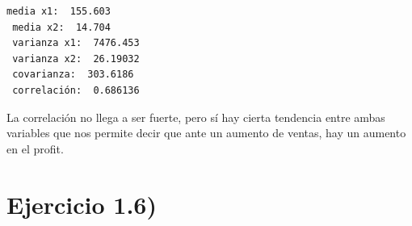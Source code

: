 \documentclass[
]{article}
\newenvironment{Shaded}{\begin{snugshade}}{\end{snugshade}}
\newcommand{\FunctionTok}[1]{\textcolor[rgb]{0.00,0.00,0.00}{#1}}
\newcommand{\NormalTok}[1]{#1}
\newcommand{\OtherTok}[1]{\textcolor[rgb]{0.56,0.35,0.01}{#1}}
\newcommand{\SpecialCharTok}[1]{\textcolor[rgb]{0.00,0.00,0.00}{#1}}
\newcommand{\StringTok}[1]{\textcolor[rgb]{0.31,0.60,0.02}{#1}}
\begin{document}
\begin{Shaded}
\end{Shaded}

\begin{verbatim}
media x1:  155.603 
 media x2:  14.704 
 varianza x1:  7476.453 
 varianza x2:  26.19032 
 covarianza:  303.6186 
 correlación:  0.686136 
\end{verbatim}

La correlación no llega a ser fuerte, pero sí hay cierta tendencia entre
ambas variables que nos permite decir que ante un aumento de ventas, hay
un aumento en el profit.

\hypertarget{ejercicio-1.6}{%
\section{Ejercicio 1.6)}\label{ejercicio-1.6}}
\end{document}
